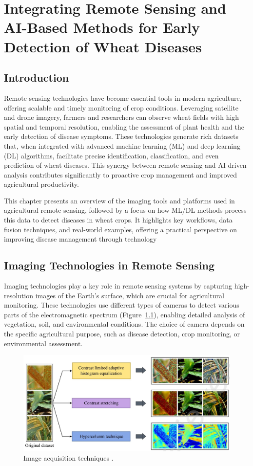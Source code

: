 \chapter{Integrating Remote Sensing and AI-Based Methods for Early Detection of Wheat Diseases}

\section{Introduction}
Remote sensing technologies have become essential tools in modern agriculture, offering scalable and timely monitoring of crop conditions. Leveraging satellite and drone imagery, farmers and researchers can observe wheat fields with high spatial and temporal resolution, enabling the assessment of plant health and the early detection of disease symptoms. These technologies generate rich datasets that, when integrated with advanced machine learning (ML) and deep learning (DL) algorithms, facilitate precise identification, classification, and even prediction of wheat diseases. This synergy between remote sensing and AI-driven analysis contributes significantly to proactive crop management and improved agricultural productivity.


This chapter presents an overview of the imaging tools and platforms used in agricultural remote sensing, followed by a focus on how ML/DL methods process this data to detect diseases in wheat crops. It highlights key workflows, data fusion techniques, and real-world examples, offering a practical perspective on improving disease management through technology

\section{Imaging Technologies in Remote Sensing}
Imaging technologies play a key role in remote sensing systems by capturing high-resolution images of the Earth’s surface, which are crucial for agricultural monitoring. These technologies use different types of cameras to detect various parts of the electromagnetic spectrum (Figure~\ref{fig:ImageAcquisition}), enabling detailed analysis of vegetation, soil, and environmental conditions. The choice of camera depends on the specific agricultural purpose, such as disease detection, crop monitoring, or environmental assessment.

\begin{figure}[H]
    \centering
    \includegraphics[width=0.8
    \textwidth]{chapters/chapter3/images/Figure01.png}
    \caption{Image acquisition techniques \protect\parencite{ghazal2024computer}.}
    \label{fig:ImageAcquisition}
\end{figure}



